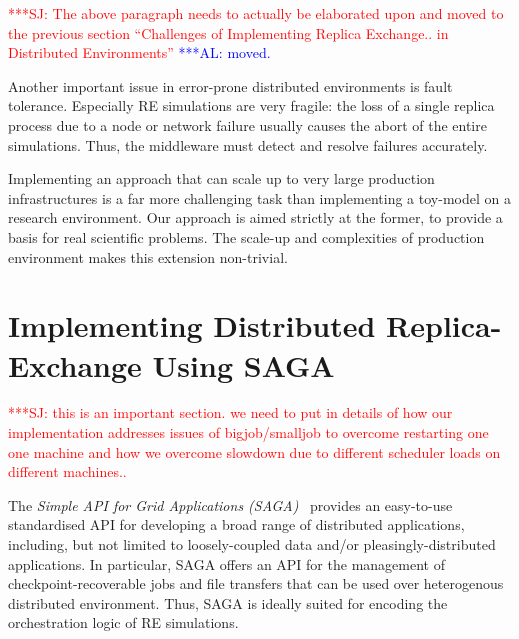 \documentclass{rspublic}
\newcommand{\alnote}[1]{ {\textcolor{blue} { ***AL: #1 }}}
\newcommand{\jhanote}[1]{ {\textcolor{red} { ***SJ: #1 }}}
\newcommand{\alnote}[1]{}
\newcommand{\jhanote}[1]{}
\begin{document}
\jhanote{The above paragraph needs to actually be elaborated upon and
  moved to the previous section ``Challenges of Implementing Replica
  Exchange.. in Distributed Environments''}
\alnote{moved.}

                 
Another important issue in error-prone distributed environments is
fault tolerance.  Especially RE simulations are very fragile: the
loss of a single replica process due to a node or network failure
usually causes the abort of the entire simulations. Thus, the
middleware must detect and resolve failures accurately.
                                  
Implementing an approach that can scale up to very large 
production infrastructures is a far more challenging task than
implementing a toy-model on a research environment. Our approach is
aimed strictly at the former, to provide a basis for real scientific
problems. The scale-up and complexities of production environment makes
this extension non-trivial.


\section{Implementing Distributed Replica-Exchange Using SAGA}

\jhanote{this is an important section. we need to put in details of
  how our implementation addresses issues of bigjob/smalljob to
  overcome restarting one one machine and how we overcome slowdown due
  to different scheduler loads on different machines..}

The \emph{Simple API for Grid Applications (SAGA)}~\citep{saga_gfd90}
provides an easy-to-use standardised API for developing a broad range
of distributed applications, including, but not limited to
loosely-coupled data and/or pleasingly-distributed applications.  
In particular, SAGA offers an API for the management of
checkpoint-recoverable jobs and file transfers that can be used over
heterogenous distributed environment. Thus, SAGA is ideally suited for
encoding the orchestration logic of RE simulations.
\end{document}
